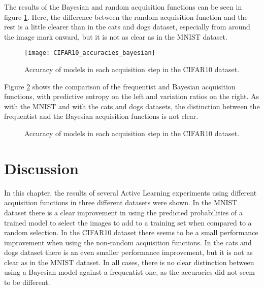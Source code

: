 The results of the Bayesian and random acquisition functions can be seen in figure \ref{fig:CIFAR10_accuracies_bayesian}. Here, the difference between the random acquisition function and the rest is a little clearer than in the cats and dogs dataset, especially from around the  image mark onward, but it is not as clear as in the MNIST dataset.

\begin{figure}[H]
    \centering
    \texttt{[image: CIFAR10\_accuracies\_bayesian]}
    \caption{Accuracy of models in each acquisition step in the CIFAR10 dataset.}
    \label{fig:CIFAR10_accuracies_bayesian}
\end{figure}

Figure \ref{fig:CIFAR10_bayesian_vs_freq} shows the comparison of the frequentist and Bayesian acquisition functions, with predictive entropy on the left and variation ratios on the right. As with the MNIST and with the cats and dogs datasets, the distinction between the frequentist and the Bayesian acquisition functions is not clear.

\begin{figure}[H]
    \centering
    \hfill
    \caption{Accuracy of models in each acquisition step in the CIFAR10 dataset.}
    \label{fig:CIFAR10_bayesian_vs_freq}
\end{figure}



\section{Discussion}

In this chapter, the results of several Active Learning experiments using different acquisition functions in three different datasets were shown. In the MNIST dataset there is a clear improvement in using the predicted probabilities of a trained model to select the images to add to a training set when compared to a random selection. In the CIFAR10 dataset there seems to be a small performance improvement when using the non-random acquisition functions. In the cats and dogs dataset there is an even smaller performance improvement, but it is not as clear as in the MNIST dataset. In all cases, there is no clear distinction between using a Bayesian model against a frequentist one, as the accuracies did not seem to be different.

